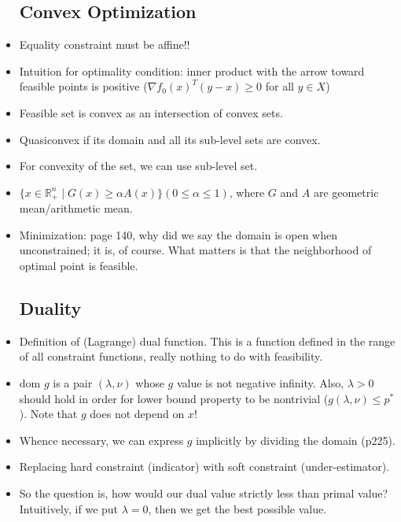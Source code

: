 \documentclass{article}
\theoremstyle{remark}
\begin{document}
\begin{itemize}
    \subsection*{Convex Optimization}
    \item Equality constraint must be affine!!
    \item Intuition for optimality condition: inner product with the arrow toward feasible points is positive ($\nabla f_0 (x)^T (y-x)\geq 0$ for all $y\in X$)
    \item Feasible set is convex as an intersection of convex sets.
    \item Quasiconvex if its domain and all its sub-level sets are convex.
    \item For convexity of the set, we can use sub-level set.
    \item $\{x\in\mathbb{R}^n_+\mid G(x)\geq \alpha A(x)\}(0\leq \alpha\leq 1)$, where $G$ and $A$ are geometric mean/arithmetic mean.
    \item Minimization: page 140, why did we say the domain is open when unconstrained; it is, of course. What matters is that the neighborhood of optimal point is feasible.
    \subsection*{Duality}
    \item Definition of (Lagrange) dual function. This is a function defined in the range of all constraint functions, really nothing to do with feasibility.
    \item dom $g$ is a pair $(\lambda,\nu)$ whose $g$ value is not negative infinity. Also, $\lambda>0$ should hold in order for lower bound property to be nontrivial ($g(\lambda, \nu)\leq p^*$). Note that $g$ does not depend on $x$!
    \item Whence necessary, we can express $g$ implicitly by dividing the domain (p225).
    \item Replacing hard constraint (indicator) with soft constraint (under-estimator).
    \item So the question is, how would our dual value strictly less than primal value? Intuitively, if we put $\lambda=0$, then we get the best possible value. 
    

\end{itemize}
\end{document}
